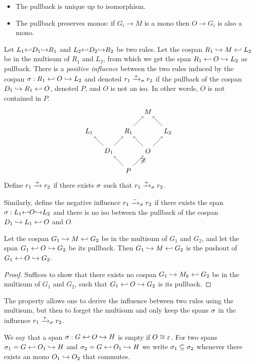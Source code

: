 \begin{property}
  \begin{itemize}
  \item The pullback is unique up to isomorphism.
  \item The pullback preserves monos: if $G_i\to M$ is a mono then $O\to G_i$ is also a mono.
  \end{itemize}
\end{property}

\begin{definition}
  \label{def:pos_infl}
  Let $L_1{\hookleftarrow} D_1 {\hookrightarrow} R_1$ and $L_2{\hookleftarrow} D_2 {\hookrightarrow} R_2$ be two rules.
%
  Let the cospan $R_1\hookrightarrow M\hookleftarrow L_2$ be in the multisum of $R_1$ and $L_2$, from which we get the span $R_1\hookleftarrow O\hookrightarrow L_2$ as pullback.
%
  There is a \emph{positive influence} between the two rules induced by the cospan $\sigma:R_1\hookleftarrow O\hookrightarrow L_2$ and denoted $r_1\mathrel{\xrightarrow{+}}_{\sigma} r_2$ if the pullback of the cospan $D_1\hookrightarrow R_1\hookleftarrow O$, denoted $P$, and $O$ is not an iso. In other words, $O$ is not contained in $P$.
  \[
  \begin{tikzpicture} %
    \node (p) at (0,-1) {\(P\)};
    \node (d1) at (-1,0) {\(D_1\)};
    \node (o) at (1,0) {\(O\)};
    \node (m) at (1,2) {\(M\)};
    \node (r1) at (0,1) {\(R_1\)};
    \node (l1) at (-2,1) {\(L_1\)};
    \node (l2) at (2,1) {\(L_2\)};
    \draw [->] (p) -- (d1);
    \draw [->] (p) -- node [right,midway] {$\not\iso$}  (o);
    \draw [->] (d1) -- (r1);
    \draw [->] (d1) -- (l1);
    \draw [->] (o) -- (r1);
    \draw [->] (o) -- (l2);
    \draw [->] (r1) --  (m);
    \draw [->] (l2) --  (m);
  \end{tikzpicture}
  \]
  Define $r_1\mathrel{\xrightarrow{+}} r_2$ if there exists $\sigma$ such that $r_1\mathrel{\xrightarrow{+}}_{\sigma} r_2$.
\end{definition}

Similarly, define the negative influence $r_1\mathrel{\xrightarrow{-}}_{\sigma} r_2$ if there exists the span $\sigma:L_1{\hookleftarrow} O {\hookrightarrow} L_2$ and there is no iso between the pullback of the cospan $D_1\hookrightarrow L_1\hookleftarrow O$ and $O$.

\begin{property}
  Let the cospan $G_1\hookrightarrow M\hookleftarrow G_2$ be in the multisum of $G_1$ and $G_2$, and let the span $G_1\hookleftarrow O\hookrightarrow G_2$ be its pullback. Then $G_1\hookrightarrow M\hookleftarrow G_2$ is the pushout of $G_1\hookleftarrow O\hookrightarrow G_2$.
\end{property}
\begin{proof}
 Suffices to show that there exists no cospan $G_1\hookrightarrow M_k\hookleftarrow G_2$ be in the multisum of $G_1$ and $G_2$, such that $G_1\hookleftarrow O\hookrightarrow G_2$ is its pullback.
\end{proof}

The property allows one to derive the influence between two rules using the multisum, but then to forget the multisum and only keep the spans $\sigma$ in the influence $r_1\mathrel{\xrightarrow{+}}_{\sigma} r_2$.

We say that a span $\sigma:G\hookleftarrow O\hookrightarrow H$ is empty if $O\cong\varepsilon$. For two spans $\sigma_1 = G\hookleftarrow O_1\hookrightarrow H$ and $\sigma_2 = G\hookleftarrow O_1\hookrightarrow H$ we write $\sigma_1\subseteq \sigma_2$ whenever there exists an mono $O_1\hookrightarrow O_2$ that commutes.
